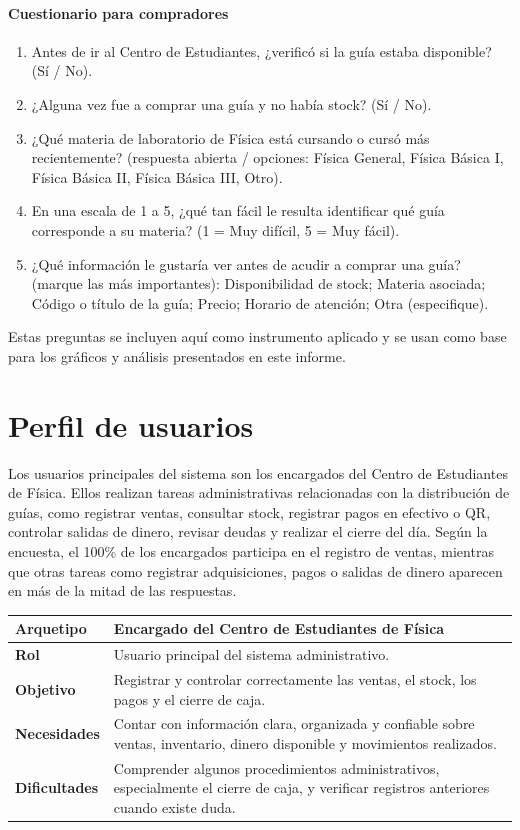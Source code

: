 \documentclass[12pt,letterpaper]{article}
\begin{document}
\paragraph{Cuestionario para compradores}
\begin{enumerate}
    \item Antes de ir al Centro de Estudiantes, ¿verificó si la guía estaba disponible? (Sí / No).
    \item ¿Alguna vez fue a comprar una guía y no había stock? (Sí / No).
    \item ¿Qué materia de laboratorio de Física está cursando o cursó más recientemente? (respuesta abierta / opciones: Física General, Física Básica I, Física Básica II, Física Básica III, Otro).
    \item En una escala de 1 a 5, ¿qué tan fácil le resulta identificar qué guía corresponde a su materia? (1 = Muy difícil, 5 = Muy fácil).
    \item ¿Qué información le gustaría ver antes de acudir a comprar una guía? (marque las más importantes): Disponibilidad de stock; Materia asociada; Código o título de la guía; Precio; Horario de atención; Otra (especifique).
\end{enumerate}

Estas preguntas se incluyen aquí como instrumento aplicado y se usan como base para los gráficos y análisis presentados en este informe.

\section{Perfil de usuarios}

Los usuarios principales del sistema son los encargados del Centro de Estudiantes de Física. Ellos realizan tareas administrativas relacionadas con la distribución de guías, como registrar ventas, consultar stock, registrar pagos en efectivo o QR, controlar salidas de dinero, revisar deudas y realizar el cierre del día. Según la encuesta, el 100\% de los encargados participa en el registro de ventas, mientras que otras tareas como registrar adquisiciones, pagos o salidas de dinero aparecen en más de la mitad de las respuestas.

\begin{center}
\begin{tabularx}{\textwidth}{|>{\bfseries}p{4cm}|X|}
\hline
Arquetipo & Encargado del Centro de Estudiantes de Física \\
\hline
Rol & Usuario principal del sistema administrativo. \\
\hline
Objetivo & Registrar y controlar correctamente las ventas, el stock, los pagos y el cierre de caja. \\
\hline
Necesidades & Contar con información clara, organizada y confiable sobre ventas, inventario, dinero disponible y movimientos realizados. \\
\hline
Dificultades & Comprender algunos procedimientos administrativos, especialmente el cierre de caja, y verificar registros anteriores cuando existe duda. \\
\hline
\end{tabularx}
\end{center}
\end{document}
